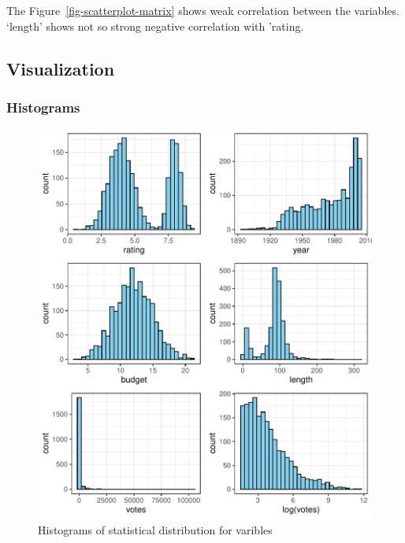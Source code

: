 \documentclass[
  letterpaper,
  DIV=11,
  numbers=noendperiod]{scrartcl}
\begin{document}
The Figure~\ref{fig-scatterplot-matrix} shows weak correlation between
the variables. `length' shows not so strong negative correlation with
'rating.

\hypertarget{sec-viz}{%
\subsection{Visualization}\label{sec-viz}}

\hypertarget{histograms}{%
\subsubsection{Histograms}\label{histograms}}

\begin{figure}

{\centering \includegraphics{Group_06_Analysis_files/figure-pdf/fig-histograms-1.pdf}

}

\caption{\label{fig-histograms}Histograms of statistical distribution
for varibles}

\end{figure}
\end{document}
